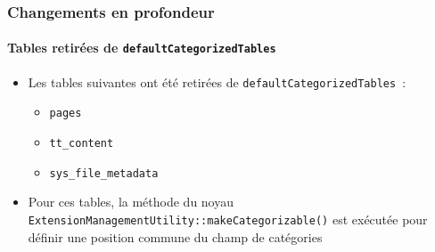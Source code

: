 \begin{frame}[fragile]
	\frametitle{Changements en profondeur}
	\framesubtitle{Tables retirées de \texttt{defaultCategorizedTables}}

	\begin{itemize}
		\item Les tables suivantes ont été retirées de \texttt{defaultCategorizedTables}~:

			\begin{itemize}
				\item \texttt{pages}
				\item \texttt{tt\_content}
				\item \texttt{sys\_file\_metadata}
			\end{itemize}

		\item Pour ces tables, la méthode du noyau\newline
			\texttt{ExtensionManagementUtility::makeCategorizable()}\newline
			est exécutée pour définir une position commune du champ de
			catégories

	\end{itemize}

\end{frame}


